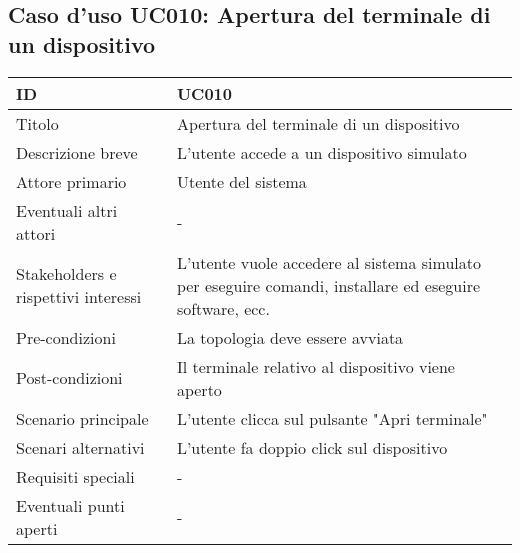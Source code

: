 \documentclass[../../main.tex]{subfiles}
\begin{document}
\subsection{Caso d’uso UC010: Apertura del terminale di un dispositivo }
\begin{tabularx}{150mm}{|l|X|}
    \hline
    ID                                  & \textbf{UC010}\\
    \hline
    Titolo                              & Apertura del terminale di un dispositivo \\
    \hline
    Descrizione breve                   & L'utente accede a un dispositivo simulato \\ 
    \hline
    Attore primario                     & Utente del sistema   \\
    \hline
    Eventuali altri attori              & -   \\
    \hline
    Stakeholders e rispettivi interessi & L'utente vuole accedere al sistema simulato per eseguire comandi, installare ed eseguire software, ecc.   \\
    \hline
    Pre-condizioni                      & La topologia deve essere avviata   \\
    \hline
    Post-condizioni                     & Il terminale relativo al dispositivo viene aperto   \\
    \hline
    Scenario principale                 & L'utente clicca sul pulsante "Apri terminale"   \\
    \hline
    Scenari alternativi                 & L'utente fa doppio click sul dispositivo   \\
    \hline
    Requisiti speciali                  & -   \\
    \hline
    Eventuali punti aperti              & -   \\
    \hline
\end{tabularx}
\vfill\newpage
\end{document}
